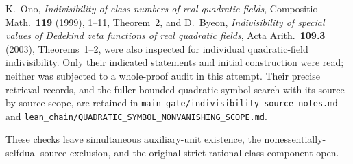 K.~Ono, \emph{Indivisibility of class numbers of real
quadratic fields}, Compositio Math.~\textbf{119} (1999),
1--11, Theorem~2, and D.~Byeon, \emph{Indivisibility of
special values of Dedekind zeta functions of real quadratic
fields}, Acta Arith.~\textbf{109.3} (2003),
Theorems~1--2, were also inspected for individual
quadratic-field indivisibility.  Only their indicated
statements and initial construction were read; neither
was subjected to a whole-proof audit in this attempt.
Their precise retrieval records, and the fuller bounded
quadratic-symbol search with its source-by-source scope,
are retained in
\texttt{main\_gate/indivisibility\_source\_notes.md} and
\texttt{lean\_chain/QUADRATIC\_SYMBOL\_NONVANISHING\_SCOPE.md}.

These checks leave simultaneous auxiliary-unit existence,
the nonessentially-selfdual source exclusion, and the
original strict rational class component open.
